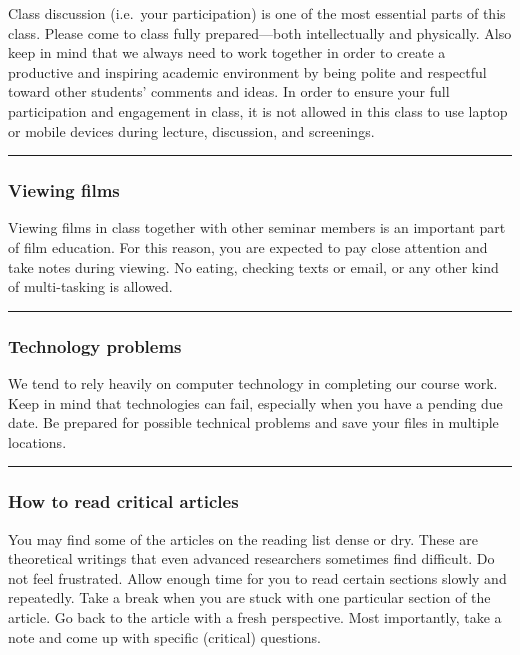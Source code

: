 \documentclass[
  letterpaper,
  DIV=11,
  numbers=noendperiod,
  oneside]{scrartcl}
\begin{document}
Class discussion (i.e.~your participation) is one of the most essential
parts of this class. Please come to class fully prepared---both
intellectually and physically. Also keep in mind that we always need to
work together in order to create a productive and inspiring academic
environment by being polite and respectful toward other students'
comments and ideas. In order to ensure your full participation and
engagement in class, it is not allowed in this class to use laptop or
mobile devices during lecture, discussion, and screenings.

\begin{center}\rule{0.5\linewidth}{0.5pt}\end{center}

\subsubsection{Viewing films}\label{viewing-films}

Viewing films in class together with other seminar members is an
important part of film education. For this reason, you are expected to
pay close attention and take notes during viewing. No eating, checking
texts or email, or any other kind of multi-tasking is allowed.

\begin{center}\rule{0.5\linewidth}{0.5pt}\end{center}

\subsubsection{Technology problems}\label{technology-problems}

We tend to rely heavily on computer technology in completing our course
work. Keep in mind that technologies can fail, especially when you have
a pending due date. Be prepared for possible technical problems and save
your files in multiple locations.

\begin{center}\rule{0.5\linewidth}{0.5pt}\end{center}

\subsubsection{How to read critical
articles}\label{how-to-read-critical-articles}

You may find some of the articles on the reading list dense or dry.
These are theoretical writings that even advanced researchers sometimes
find difficult. Do not feel frustrated. Allow enough time for you to
read certain sections slowly and repeatedly. Take a break when you are
stuck with one particular section of the article. Go back to the article
with a fresh perspective. Most importantly, take a note and come up with
specific (critical) questions.
\end{document}
